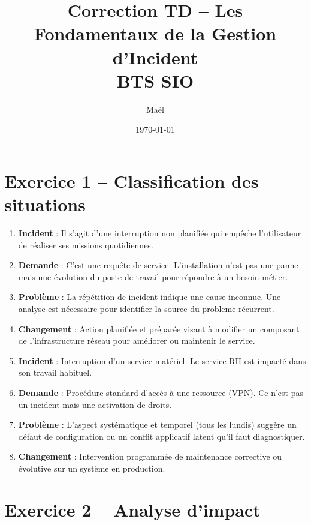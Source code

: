 \documentclass[12pt,a4paper]{extarticle}
\title{\textbf{Correction TD -- Les Fondamentaux de la Gestion d’Incident}\\
BTS SIO}
\author{Maël}
\date{\today}
\begin{document}
\maketitle
\vspace{2cm}
\section*{Exercice 1 -- Classification des situations}

\begin{enumerate}
    \item \textbf{Incident} : Il s'agit d'une interruption non planifiée qui empêche l'utilisateur de réaliser ses missions quotidiennes.
    \item \textbf{Demande} : C'est une requête de service. L'installation n'est pas une panne mais une évolution du poste de travail pour répondre à un besoin métier.
    \item \textbf{Problème} : La répétition de incident indique une cause inconnue. Une analyse est nécessaire pour identifier la source du probleme récurrent.
    \item \textbf{Changement} : Action planifiée et préparée visant à modifier un composant de l'infrastructure réseau pour améliorer ou maintenir le service.
    \item \textbf{Incident} : Interruption d'un service matériel. Le service RH est impacté dans son travail habituel.
    \item \textbf{Demande} : Procédure standard d'accès à une ressource (VPN). Ce n'est pas un incident mais une activation de droits.
    \item \textbf{Problème} : L'aspect systématique et temporel (tous les lundis) suggère un défaut de configuration ou un conflit applicatif latent qu'il faut diagnostiquer.
    \item \textbf{Changement} : Intervention programmée de maintenance corrective ou évolutive sur un système en production.
\end{enumerate}

\vspace{0.5cm}
\clearpage
\section*{Exercice 2 -- Analyse d’impact}
\end{document}
